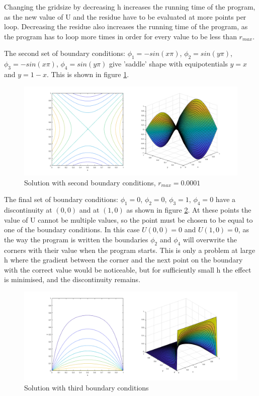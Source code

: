 \documentclass[11pt, oneside, titlepage]{article}   	%
\begin{document}
Changing the gridsize by decreasing h increases the running time of the program, as the new value of U and the residue have to be evaluated at more points per loop.  Decreasing the residue also increases the running time of the program, as the program has to loop more times in order for every value to be less than $r_{max}$.


The second set of boundary conditions: $\phi_1 = -sin(x\pi)$, $\phi_2 = sin(y\pi)$, $\phi_3 = -sin(x\pi)$, $\phi_4 = sin(y\pi)$ give 'saddle'  shape with equipotentials $y = x$ and $y = 1-x$. This is shown in figure \ref{fig:relaxation12}.

\begin{figure}[H]
	\includegraphics[width = \textwidth]{relaxation1_2}
	\caption{Solution with second boundary conditions, $r_{max} = 0.0001$} \label{fig:relaxation12}
\end{figure}

The final set of boundary conditions: $\phi_1 = 0$, $\phi_2 = 0$, $\phi_3 = 1$, $\phi_4 = 0$ have a discontinuity at $(0,0)$ and at $(1,0)$ as shown in figure \ref{fig:relaxation1c}. At these points the value of U cannot be multiple values, so the point must be chosen to be equal to one of the boundary conditions. In this case $U(0,0) = 0$ and $U(1,0) = 0$, as the way the program is written the boundaries $\phi_2$ and $\phi_4$ will overwrite the corners with their value when the program starts. This is only a problem at large h where the gradient between the corner and the next point on the boundary with the correct value would be noticeable, but for sufficiently small h the effect is minimised, and the discontinuity remains.

\begin{figure}[H]
	\includegraphics[width = \textwidth]{relaxation1_1c}
	\caption{Solution with third boundary conditions} \label{fig:relaxation1c}
\end{figure}
\end{document}
